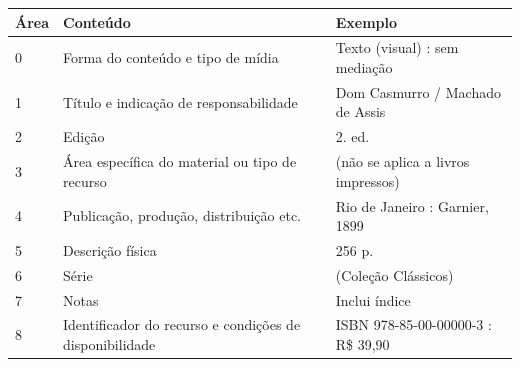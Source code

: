\begin{quadro}[htb]
    \centering
    \caption{Áreas da descrição segundo a ISBD}
    \label{qua:isbd-areas}
    \footnotesize
    \begin{tabular}{|p{}|p{}|p{}|}
        \hline
        \textbf{Área} & \textbf{Conteúdo} & \textbf{Exemplo} \\ \hline
        0 & Forma do conteúdo e tipo de mídia & Texto (visual) : sem mediação \\ \hline
        1 & Título e indicação de responsabilidade & Dom Casmurro / Machado de Assis \\ \hline
        2 & Edição & 2. ed. \\ \hline
        3 & Área específica do material ou tipo de recurso & (não se aplica a livros impressos) \\ \hline
        4 & Publicação, produção, distribuição etc. & Rio de Janeiro : Garnier, 1899 \\ \hline
        5 & Descrição física & 256 p. \\ \hline
        6 & Série & (Coleção Clássicos) \\ \hline
        7 & Notas & Inclui índice \\ \hline
        8 & Identificador do recurso e condições de disponibilidade & ISBN 978-85-00-00000-3 : R\$ 39,90 \\ \hline
    \end{tabular}
\end{quadro}

